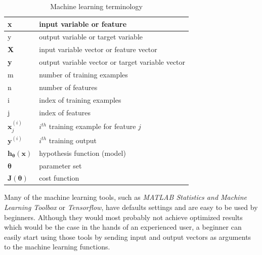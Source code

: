 \begin{table}
\caption{Machine learning terminology}
\label{arm:machineLearningTerminology}
\begin{center}
\begin{tabular}{||l|l||}\hline
x & input variable or feature \\\hline
y & output variable or target variable \\\hline
\textbf{X} & input variable vector or feature vector \\\hline
\textbf{y} & output variable vector or target variable vector \\\hline
m & number of training examples \\\hline
n & number of features \\\hline
i & index of training examples \\\hline
j & index of features \\\hline
$\textbf{x}_j^{(i)}$ & $i^{th}$ training example for feature $j$ \\\hline
$\textbf{y}^{(i)}$ & $i^{th}$ training output  \\\hline
$\textbf{h}_{\bm{\theta}}(\textbf{x})$ &hypothesis function (model)\\\hline
$\bm{\theta}$ &parameter set\\\hline
$\textbf{J}({\bm{\theta}})$ &cost function  \\\hline

\end{tabular}
\end{center}
\end{table}

Many of the machine learning tools, such as \emph{MATLAB Statistics and Machine Learning Toolbox} or \emph{Tensorflow}, have defaults settings and are easy to be used by beginners. 
Although they would most probably not achieve optimized results which would be the case in the hands of an experienced user, a beginner can easily start using those tools by sending input and output vectors as arguments to the machine learning functions. 

